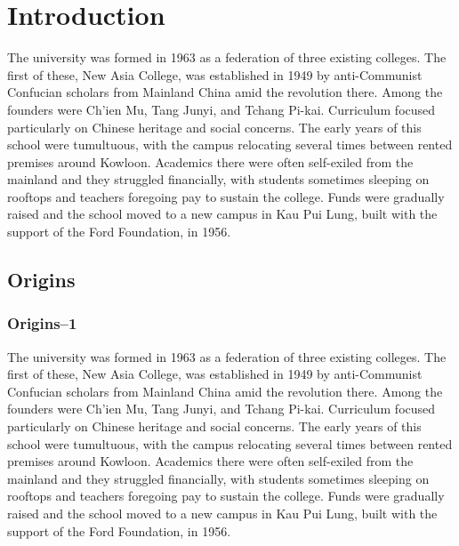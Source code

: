 \chapter{Introduction}
\label{sec:intro}



\noindent The university was formed in 1963 as a federation of three existing colleges. The first of these, New Asia College, was established in 1949 by anti-Communist Confucian scholars from Mainland China amid the revolution there. Among the founders were Ch'ien Mu, Tang Junyi, and Tchang Pi-kai. Curriculum focused particularly on Chinese heritage and social concerns. The early years of this school were tumultuous, with the campus relocating several times between rented premises around Kowloon. Academics there were often self-exiled from the mainland and they struggled financially, with students sometimes sleeping on rooftops and teachers foregoing pay to sustain the college. Funds were gradually raised and the school moved to a new campus in Kau Pui Lung, built with the support of the Ford Foundation, in 1956.

\section{Origins}
\subsection{Origins--1}
\noindent The university was formed in 1963 as a federation of three existing colleges. The first of these, New Asia College, was established in 1949 by anti-Communist Confucian scholars from Mainland China amid the revolution there. Among the founders were Ch'ien Mu, Tang Junyi, and Tchang Pi-kai. Curriculum focused particularly on Chinese heritage and social concerns. The early years of this school were tumultuous, with the campus relocating several times between rented premises around Kowloon. Academics there were often self-exiled from the mainland and they struggled financially, with students sometimes sleeping on rooftops and teachers foregoing pay to sustain the college. Funds were gradually raised and the school moved to a new campus in Kau Pui Lung, built with the support of the Ford Foundation, in 1956.

